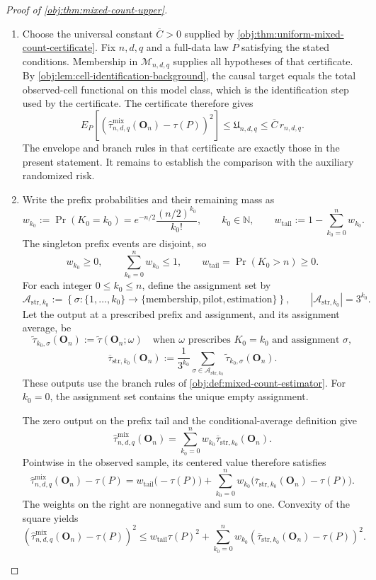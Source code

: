 \documentclass[11pt]{article}
\begin{document}
\begin{proof}[Proof of \cref{obj:thm:mixed-count-upper}]
\begin{enumerate}
\item Choose the universal constant \(\overline C>0\) supplied by
\cref{obj:thm:uniform-mixed-count-certificate}. Fix \(n,d,q\) and a full-data law \(P\) satisfying the stated conditions. Membership in \(\mathcal M_{n,d,q}\) supplies all hypotheses of that certificate.
By \cref{obj:lem:cell-identification-background}, the causal target equals the total observed-cell functional on this model class, which is the identification step used by the certificate. The certificate therefore gives
\[
E_P\!\left[
\left(
\widehat\tau^{\mathrm{mix}}_{n,d,q}(\mathbf O_n)-\tau(P)
\right)^2
\right]
\le \mathfrak U_{n,d,q}
\le \overline C\,r_{n,d,q}.
\]
The envelope and branch rules in that certificate are exactly those in the present statement. It remains to establish the comparison with the auxiliary randomized risk.

\item Write the prefix probabilities and their remaining mass as
\[
w_{k_0}:=\Pr(K_0=k_0)
=e^{-n/2}\frac{(n/2)^{k_0}}{k_0!},
\qquad k_0\in\mathbb N,
\qquad
w_{\mathrm{tail}}:=1-\sum_{k_0=0}^{n}w_{k_0}.
\]
The singleton prefix events are disjoint, so
\[
w_{k_0}\ge0,
\qquad
\sum_{k_0=0}^{n}w_{k_0}\le1,
\qquad
w_{\mathrm{tail}}=\Pr(K_0>n)\ge0.
\]
For each integer \(0\le k_0\le n\), define the assignment set by
\[
\mathcal A_{\mathrm{str},k_0}
:=
\left\{
\sigma:\{1,\ldots,k_0\}
\longrightarrow
\{\mathrm{membership},\mathrm{pilot},\mathrm{estimation}\}
\right\},
\qquad
|\mathcal A_{\mathrm{str},k_0}|=3^{k_0}.
\]
Let the output at a prescribed prefix and assignment, and its assignment average, be
\[
\widetilde\tau_{k_0,\sigma}(\mathbf O_n)
:=
\widetilde\tau(\mathbf O_n;\omega)
\quad\text{when }\omega\text{ prescribes }K_0=k_0
\text{ and assignment }\sigma,
\]
\[
\overline\tau_{\mathrm{str},k_0}(\mathbf O_n)
:=
\frac{1}{3^{k_0}}
\sum_{\sigma\in\mathcal A_{\mathrm{str},k_0}}
\widetilde\tau_{k_0,\sigma}(\mathbf O_n).
\]
These outputs use the branch rules of
\cref{obj:def:mixed-count-estimator}. For \(k_0=0\), the assignment set contains the unique empty assignment.

The zero output on the prefix tail and the conditional-average definition give
\[
\widehat\tau^{\mathrm{mix}}_{n,d,q}(\mathbf O_n)
=
\sum_{k_0=0}^{n}
w_{k_0}\overline\tau_{\mathrm{str},k_0}(\mathbf O_n).
\]
Pointwise in the observed sample, its centered value therefore satisfies
\[
\widehat\tau^{\mathrm{mix}}_{n,d,q}(\mathbf O_n)-\tau(P)
=
w_{\mathrm{tail}}\bigl(-\tau(P)\bigr)
+
\sum_{k_0=0}^{n}
w_{k_0}
\bigl(\overline\tau_{\mathrm{str},k_0}(\mathbf O_n)-\tau(P)\bigr).
\]
The weights on the right are nonnegative and sum to one. Convexity of the square yields
\[
\left(
\widehat\tau^{\mathrm{mix}}_{n,d,q}(\mathbf O_n)-\tau(P)
\right)^2
\le
w_{\mathrm{tail}}\tau(P)^2
+
\sum_{k_0=0}^{n}
w_{k_0}
\left(
\overline\tau_{\mathrm{str},k_0}(\mathbf O_n)-\tau(P)
\right)^2.
\]


\end{enumerate}
\end{proof}
\end{document}
